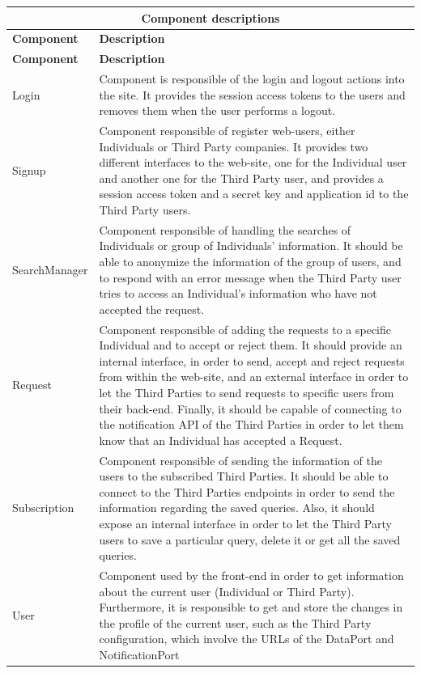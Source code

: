 \documentclass[a4paper, hidelinks, 12pt]{report}
\begin{document}
		\begin{longtable}{l p{}}
			\hline\hline
			\multicolumn{2}{c}{\textbf{Component descriptions}} \\
			\hline
			\textbf{Component} & \textbf{Description} \\ [0.5ex]
			\hline
			\endfirsthead
			\hline
			\textbf{Component} & \textbf{Description} \\ [0.5ex]
			\hline
			\endhead
			Login & Component is responsible of the login and logout actions into the site. It provides the session access tokens to the users and removes them when the user performs a logout. \\
			
			Signup & Component responsible of register web-users, either Individuals or Third Party companies. It provides two different interfaces to the web-site, one for the Individual user and another one for the Third Party user, and provides a session access token and a secret key and application id to the Third Party users. \\
			
			SearchManager & Component responsible of handling the searches of Individuals or group of Individuals' information. It should be able to anonymize the information of the group of users, and to respond with an error message when the Third Party user tries to access an Individual's information who have not accepted the request. \\
			
			Request & Component responsible of adding the requests to a specific Individual and to accept or reject them. It should provide an internal interface, in order to send, accept and reject requests from within the web-site, and an external interface in order to let the Third Parties to send requests to specific users from their back-end. Finally, it should be capable of connecting to the notification API of the Third Parties in order to let them know that an Individual has accepted a Request.\\
			
			Subscription & Component responsible of sending the information of the users to the subscribed Third Parties. It should be able to connect to the Third Parties endpoints in order to send the information regarding the saved queries. Also, it should expose an internal interface in order to let the Third Party users to save a particular query, delete it or get all the saved queries.\\
			User & Component used by the front-end in order to get information about the current user (Individual or Third Party). Furthermore, it is responsible to get and store the changes in the profile of the current user, such as the Third Party configuration, which involve the URLs of the DataPort and NotificationPort\\
			

\end{longtable}
\end{document}
